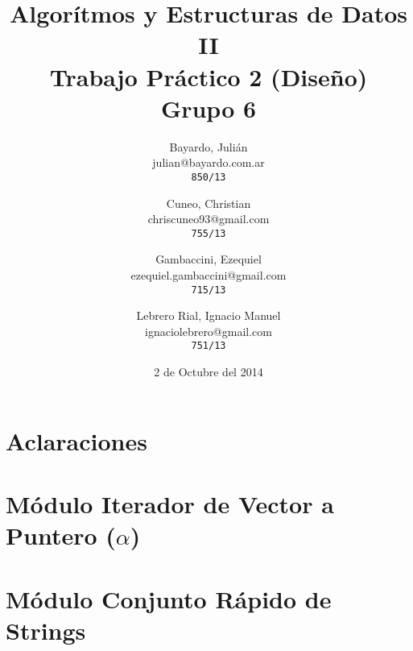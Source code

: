 \documentclass[a4paper,titlepage]{article}
\begin{document}
\title{Algorítmos y Estructuras de Datos II\\
Trabajo Práctico 2 (Diseño)\\
Grupo 6}

\author{
  Bayardo, Julián\\
  julian@bayardo.com.ar\\
  \texttt{850/13}
  \and
  Cuneo, Christian\\
  chriscuneo93@gmail.com\\
  \texttt{755/13}
  \and
  Gambaccini, Ezequiel\\
  ezequiel.gambaccini@gmail.com\\
  \texttt{715/13}
  \and
  Lebrero Rial, Ignacio Manuel\\
  ignaciolebrero@gmail.com\\
  \texttt{751/13}
}

\date{2 de Octubre del 2014}

\maketitle


\section{Aclaraciones}

\section{Módulo Iterador de Vector a Puntero ($\alpha$)}



\section{Módulo Conjunto Rápido de Strings}
\end{document}
